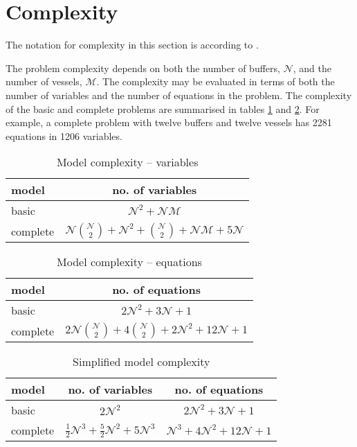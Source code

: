 \section{Complexity}\label{S.complexity}
The notation for complexity in this section is according to \citet{Knuth:1976}.

The problem complexity depends on both the number of buffers, $\mathcal{N}$,
and the number of vessels, $\mathcal{M}$.
The complexity may be evaluated in terms of both the number of variables and
the number of equations in the problem.
The complexity of the basic and complete problems are summarised in tables
\ref{tbl.complexity1} and \ref{tbl.complexity1b}.
For example, a complete problem with twelve buffers and twelve vessels has
\num{2281} equations in \num{1206} variables.
\begin{table}[t]
    \centering
    \caption{Model complexity -- variables}
    \label{tbl.complexity1}
    \begin{tabular}{l | c }
        model & no. of variables \\ \hline
        basic & $\mathcal{N}^2 + \mathcal{N} \mathcal{M}$\\
        complete & $\mathcal{N} {{\mathcal{N}}\choose{2}} + \mathcal{N}^2
            + {{\mathcal{N}}\choose{2}} + \mathcal{N} \mathcal{M}
            + 5\mathcal{N}$\\
    \end{tabular}
\end{table}
\begin{table}[t]
    \centering
    \caption{Model complexity -- equations}
    \label{tbl.complexity1b}
    \begin{tabular}{l | c }
        model & no. of equations\\ \hline
        basic & $2\mathcal{N}^2 + 3\mathcal{N} + 1$\\
        complete  & $2\mathcal{N}{{\mathcal{N}}\choose{2}} 
            + 4{{\mathcal{N}}\choose{2}} + 2\mathcal{N}^2 + 12\mathcal{N} +1$\\
    \end{tabular}
\end{table}
\begin{table}[t]
    \centering
    \caption{Simplified model complexity}
    \label{tbl.complexity2}
    \begin{tabular}{l | c | c}
        model & no. of variables & no. of equations\\ \hline
        basic & $2\mathcal{N}^2$ & $2\mathcal{N}^2 + 3\mathcal{N} + 1$\\
        complete & $\tfrac{1}{2}\mathcal{N}^{3} + \tfrac{5}{2}\mathcal{N}^{2}
                    + 5\mathcal{N}^{3}$
            & $\mathcal{N}^{3} + 4\mathcal{N}^{2} + 12\mathcal{N} + 1$\\
    \end{tabular}
\end{table}

